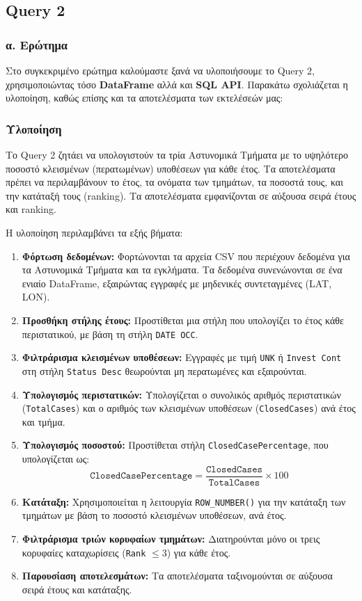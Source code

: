 \documentclass{article}
\begin{document}
\newpage
\subsection{Query 2}
\subsubsection*{\large  α. Ερώτημα}
Στο συγκεκριμένο ερώτημα καλούμαστε ξανά να υλοποιήσουμε το Query 2, χρησιμοποιώντας τόσο \textbf{DataFrame} αλλά και \textbf{SQL API}. Παρακάτω σχολιάζεται η υλοποίηση, καθώς επίσης και τα αποτελέσματα των εκτελέσεών μας: 

\subsubsection*{Υλοποίηση}

Το Query 2 ζητάει να υπολογιστούν τα τρία Αστυνομικά Τμήματα με το υψηλότερο ποσοστό κλεισμένων (περατωμένων) υποθέσεων για κάθε έτος. Τα αποτελέσματα πρέπει να περιλαμβάνουν το έτος, τα ονόματα των τμημάτων, τα ποσοστά τους, και την κατάταξή τους (ranking). Τα αποτελέσματα εμφανίζονται σε αύξουσα σειρά έτους και ranking.

Η υλοποίηση περιλαμβάνει τα εξής βήματα:
\begin{enumerate}
    \item \textbf{Φόρτωση δεδομένων:} Φορτώνονται τα αρχεία CSV που περιέχουν δεδομένα για τα Αστυνομικά Τμήματα και τα εγκλήματα. Τα δεδομένα συνενώνονται σε ένα ενιαίο DataFrame, εξαιρώντας εγγραφές με μηδενικές συντεταγμένες (LAT, LON).
    \item \textbf{Προσθήκη στήλης έτους:} Προστίθεται μια στήλη που υπολογίζει το έτος κάθε περιστατικού, με βάση τη στήλη \texttt{DATE OCC}.
    \item \textbf{Φιλτράρισμα κλεισμένων υποθέσεων:} Εγγραφές με τιμή \texttt{UNK} ή \texttt{Invest Cont} στη στήλη \texttt{Status Desc} θεωρούνται μη περατωμένες και εξαιρούνται.
    \item \textbf{Υπολογισμός περιστατικών:} Υπολογίζεται ο συνολικός αριθμός περιστατικών (\texttt{TotalCases}) και ο αριθμός των κλεισμένων υποθέσεων (\texttt{ClosedCases}) ανά έτος και τμήμα.
    \item \textbf{Υπολογισμός ποσοστού:} Προστίθεται στήλη \texttt{ClosedCasePercentage}, που υπολογίζεται ως:
          \[
          \texttt{ClosedCasePercentage} = \frac{\texttt{ClosedCases}}{\texttt{TotalCases}} \times 100
          \]
    \item \textbf{Κατάταξη:} Χρησιμοποιείται η λειτουργία \texttt{ROW\_NUMBER()} για την κατάταξη των τμημάτων με βάση το ποσοστό κλεισμένων υποθέσεων, ανά έτος.
    \item \textbf{Φιλτράρισμα τριών κορυφαίων τμημάτων:} Διατηρούνται μόνο οι τρεις κορυφαίες καταχωρίσεις (\texttt{Rank} $\leq 3$) για κάθε έτος.
    \item \textbf{Παρουσίαση αποτελεσμάτων:} Τα αποτελέσματα ταξινομούνται σε αύξουσα σειρά έτους και κατάταξης.
\end{enumerate}
\end{document}
